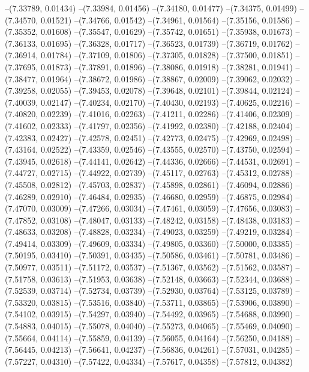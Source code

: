--(7.33789, 0.01434)
--(7.33984, 0.01456)
--(7.34180, 0.01477)
--(7.34375, 0.01499)
--(7.34570, 0.01521)
--(7.34766, 0.01542)
--(7.34961, 0.01564)
--(7.35156, 0.01586)
--(7.35352, 0.01608)
--(7.35547, 0.01629)
--(7.35742, 0.01651)
--(7.35938, 0.01673)
--(7.36133, 0.01695)
--(7.36328, 0.01717)
--(7.36523, 0.01739)
--(7.36719, 0.01762)
--(7.36914, 0.01784)
--(7.37109, 0.01806)
--(7.37305, 0.01828)
--(7.37500, 0.01851)
--(7.37695, 0.01873)
--(7.37891, 0.01896)
--(7.38086, 0.01918)
--(7.38281, 0.01941)
--(7.38477, 0.01964)
--(7.38672, 0.01986)
--(7.38867, 0.02009)
--(7.39062, 0.02032)
--(7.39258, 0.02055)
--(7.39453, 0.02078)
--(7.39648, 0.02101)
--(7.39844, 0.02124)
--(7.40039, 0.02147)
--(7.40234, 0.02170)
--(7.40430, 0.02193)
--(7.40625, 0.02216)
--(7.40820, 0.02239)
--(7.41016, 0.02263)
--(7.41211, 0.02286)
--(7.41406, 0.02309)
--(7.41602, 0.02333)
--(7.41797, 0.02356)
--(7.41992, 0.02380)
--(7.42188, 0.02404)
--(7.42383, 0.02427)
--(7.42578, 0.02451)
--(7.42773, 0.02475)
--(7.42969, 0.02498)
--(7.43164, 0.02522)
--(7.43359, 0.02546)
--(7.43555, 0.02570)
--(7.43750, 0.02594)
--(7.43945, 0.02618)
--(7.44141, 0.02642)
--(7.44336, 0.02666)
--(7.44531, 0.02691)
--(7.44727, 0.02715)
--(7.44922, 0.02739)
--(7.45117, 0.02763)
--(7.45312, 0.02788)
--(7.45508, 0.02812)
--(7.45703, 0.02837)
--(7.45898, 0.02861)
--(7.46094, 0.02886)
--(7.46289, 0.02910)
--(7.46484, 0.02935)
--(7.46680, 0.02959)
--(7.46875, 0.02984)
--(7.47070, 0.03009)
--(7.47266, 0.03034)
--(7.47461, 0.03059)
--(7.47656, 0.03083)
--(7.47852, 0.03108)
--(7.48047, 0.03133)
--(7.48242, 0.03158)
--(7.48438, 0.03183)
--(7.48633, 0.03208)
--(7.48828, 0.03234)
--(7.49023, 0.03259)
--(7.49219, 0.03284)
--(7.49414, 0.03309)
--(7.49609, 0.03334)
--(7.49805, 0.03360)
--(7.50000, 0.03385)
--(7.50195, 0.03410)
--(7.50391, 0.03435)
--(7.50586, 0.03461)
--(7.50781, 0.03486)
--(7.50977, 0.03511)
--(7.51172, 0.03537)
--(7.51367, 0.03562)
--(7.51562, 0.03587)
--(7.51758, 0.03613)
--(7.51953, 0.03638)
--(7.52148, 0.03663)
--(7.52344, 0.03688)
--(7.52539, 0.03714)
--(7.52734, 0.03739)
--(7.52930, 0.03764)
--(7.53125, 0.03789)
--(7.53320, 0.03815)
--(7.53516, 0.03840)
--(7.53711, 0.03865)
--(7.53906, 0.03890)
--(7.54102, 0.03915)
--(7.54297, 0.03940)
--(7.54492, 0.03965)
--(7.54688, 0.03990)
--(7.54883, 0.04015)
--(7.55078, 0.04040)
--(7.55273, 0.04065)
--(7.55469, 0.04090)
--(7.55664, 0.04114)
--(7.55859, 0.04139)
--(7.56055, 0.04164)
--(7.56250, 0.04188)
--(7.56445, 0.04213)
--(7.56641, 0.04237)
--(7.56836, 0.04261)
--(7.57031, 0.04285)
--(7.57227, 0.04310)
--(7.57422, 0.04334)
--(7.57617, 0.04358)
--(7.57812, 0.04382)
